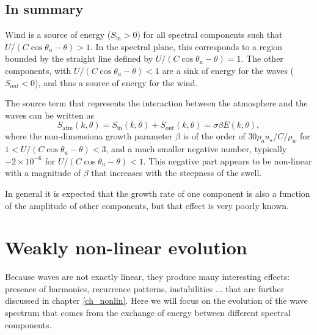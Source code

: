 \subsection{In summary}
Wind is a source of energy  ($S_{\mathrm{in}} > 0$) for all spectral components 
such that  $U/(C \cos \theta_u - \theta) > 1$. 
In the spectral plane, this corresponds to a region bounded by the straight line defined by $U/(C \cos \theta_u - \theta) = 1$. 
The other components, with $U/(C \cos \theta_u - \theta) < 1$ are a sink of energy for the waves  ($S_{out} < 0$), and thus a source of energy for the wind. 

The source term that represents the interaction between the atmosphere and the waves can be written as 
\begin{equation}
S_{\mathrm{atm}}(k,\theta)=S_{\mathrm{in}}(k,\theta)+S_{\mathrm{out}}(k,\theta) = \sigma \beta E(k,\theta),
\end{equation}
where the non-dimensiona growth parameter $\beta$ is of the order of $30 \rho_a u_\star / C / \rho_w$ for $1 < U/(C \cos \theta_u - \theta) < 3$, 
and a much smaller negative number, typically $-2 \times 10^{-6}$ for  $U/(C \cos \theta_u - \theta) < 1$. This negative 
part appears to be non-linear with a magnitude of $\beta$ that increases with the steepness of the swell. 

In general it is expected that the growth rate of one component is also a function of the amplitude of other components, but that effect is very poorly 
known.

\section{Weakly non-linear evolution}
Because waves are not exactly linear, 
they produce many interesting effects: presence of harmonics, recurrence patterns, instabilities ... that are further discussed in 
chapter  \ref{ch_nonlin}. Here we will focus on the evolution of the wave spectrum that comes from the exchange of 
energy between different spectral components. 


